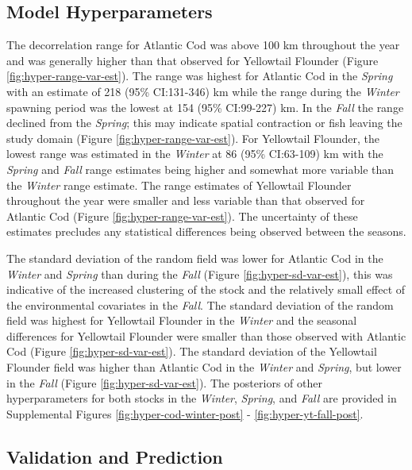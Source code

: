 \documentclass[
]{article}
\begin{document}
\hypertarget{model-hyperparameters}{%
\subsection{Model Hyperparameters}\label{model-hyperparameters}}

The decorrelation range for Atlantic Cod was above 100 km throughout the year and was generally higher than that observed for Yellowtail Flounder (Figure \ref{fig:hyper-range-var-est}). The range was highest for Atlantic Cod in the \emph{Spring} with an estimate of 218 (95\% CI:131-346) km while the range during the \emph{Winter} spawning period was the lowest at 154 (95\% CI:99-227) km. In the \emph{Fall} the range declined from the \emph{Spring}; this may indicate spatial contraction or fish leaving the study domain (Figure \ref{fig:hyper-range-var-est}). For Yellowtail Flounder, the lowest range was estimated in the \emph{Winter} at 86 (95\% CI:63-109) km with the \emph{Spring} and \emph{Fall} range estimates being higher and somewhat more variable than the \emph{Winter} range estimate. The range estimates of Yellowtail Flounder throughout the year were smaller and less variable than that observed for Atlantic Cod (Figure \ref{fig:hyper-range-var-est}). The uncertainty of these estimates precludes any statistical differences being observed between the seasons.

The standard deviation of the random field was lower for Atlantic Cod in the \emph{Winter} and \emph{Spring} than during the \emph{Fall} (Figure \ref{fig:hyper-sd-var-est}), this was indicative of the increased clustering of the stock and the relatively small effect of the environmental covariates in the \emph{Fall}. The standard deviation of the random field was highest for Yellowtail Flounder in the \emph{Winter} and the seasonal differences for Yellowtail Flounder were smaller than those observed with Atlantic Cod (Figure \ref{fig:hyper-sd-var-est}). The standard deviation of the Yellowtail Flounder field was higher than Atlantic Cod in the \emph{Winter} and \emph{Spring}, but lower in the \emph{Fall} (Figure \ref{fig:hyper-sd-var-est}). The posteriors of other hyperparameters for both stocks in the \emph{Winter}, \emph{Spring}, and \emph{Fall} are provided in Supplemental Figures \ref{fig:hyper-cod-winter-post} - \ref{fig:hyper-yt-fall-post}.

\hypertarget{validation-and-prediction}{%
\subsection{Validation and Prediction}\label{validation-and-prediction}}
\end{document}
